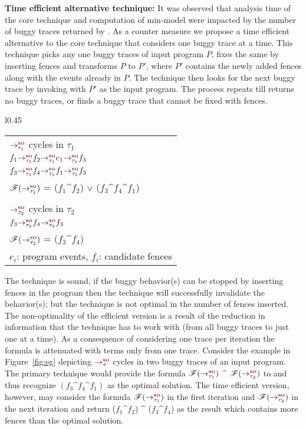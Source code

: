 {\bf Time efficient alternative technique:} It was observed that analysis
time of the core technique and \z computation of min-model were impacted
by the number of buggy traces returned by \cds.
%
As a counter measure we propose a time efficient alternative to the core 
technique that considers one buggy trace at a time.
%
This technique picks any one buggy traces of input program $P$,
fixes the same by inserting \sc fences and  transforms $P$ to $P'$,
where $P'$ contains the newly added \sc fences along with the events already
in $P$. 
%
The technique then looks for the next buggy trace by invoking \cds 
with $P'$ as the input program. 
The process repeats till \cds returns no buggy traces, or
finds a buggy trace that cannot be fixed with \sc fences.

\begin{wrapfigure}{l}{0.45\textwidth}
	\begin{tabular}{|l|}
		\hline
		$\so{\tau_1}{}{}$ cycles in $\tau_1$\\
		\tab$\so{\tau_1}{\so{\tau_1}{\so{\tau_1}{f_1}{f_2}}{e_1}}{f_3}$\\
		\tab$\so{\tau_1}{\so{\tau_1}{\so{\tau_1}{f_3}{f_4}}{f_1}}{f_3}$\\
		$\formula{\so{\tau_1}{}{}}$ = ($f_1 \^ f_2$) $\vee$ ($f_3 \^ f_4 \^ f_1$)\\
		\\
		$\so{\tau_2}{}{}$ cycles in $\tau_2$\\
		\tab$\so{\tau_2}{\so{\tau_2}{f_3}{f_4}}{f_3}$\\
		$\formula{\so{\tau_2}{}{}}$ = ($f_3 \^ f_4$)\\
		\hline
		\multicolumn{1}{r}{\scriptsize $e_i$: program events,
					$f_i$: candidate fences}
	\end{tabular}
	\caption{example showing non-optimality of the efficient version }
	\label{fig:eg}
\end{wrapfigure}

The technique is sound, \ie if the buggy behavior(s) can be stopped by 
inserting \sc fences in the program then the technique will successfully
invalidate the behavior(s);
but the technique is not optimal in the number of fences inserted.
The non-optimality of the efficient version is a result of the reduction
in information that the technique has to work with (from all buggy traces
to just one at a time). As a consequence of considering one trace per
iteration the \z formula is attenuated with terms only from one trace.
%
Consider the example in Figure~\ref{fig:eg} depicting $\setSO$ cycles in 
two buggy traces of an input program. The primary \ourtechnique 
technique would provide the formula $\formula{\so{\tau_1}{}{}}$ $\^$ 
$\formula{\so{\tau_2}{}{}}$ to \z and thus recognize $(f_3 \^ f_4 \^ f_1)$ 
as the optimal solution.
The time efficient version, however, may consider the formula 
$\formula{\so{\tau_1}{}{}}$ in the first iteration and 
$\formula{\so{\tau_2}{}{}}$ in the next iteration and return  ($f_1 \^ f_2$) 
$\^$ ($f_3 \^ f_4$) as the result which contains more fences than the 
optimal solution.

